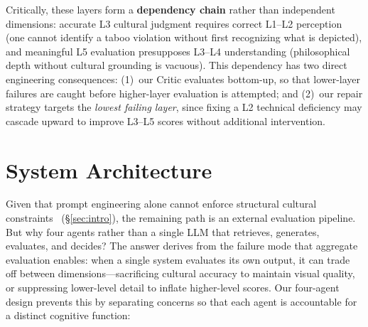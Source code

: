 \documentclass[sigconf, screen, review, anonymous]{acmart}
\newcommand{\Lx}[1]{L#1}
\begin{document}
\noindent
Critically, these layers form a \textbf{dependency chain} rather than independent dimensions: accurate \Lx{3} cultural judgment requires correct \Lx{1}--\Lx{2} perception (one cannot identify a taboo violation without first recognizing what is depicted), and meaningful \Lx{5} evaluation presupposes \Lx{3}--\Lx{4} understanding (philosophical depth without cultural grounding is vacuous).
This dependency has two direct engineering consequences: (1)~our Critic evaluates bottom-up, so that lower-layer failures are caught before higher-layer evaluation is attempted; and (2)~our repair strategy targets the \emph{lowest failing layer}, since fixing a \Lx{2} technical deficiency may cascade upward to improve \Lx{3}--\Lx{5} scores without additional intervention.

\section{System Architecture}
\label{sec:system}

Given that prompt engineering alone cannot enforce structural cultural constraints~\cite{jeong2025culturetrip, ventura2025cultural, shi2025culture} (\S\ref{sec:intro}), the remaining path is an external evaluation pipeline.
But why four agents rather than a single LLM that retrieves, generates, evaluates, and decides?
The answer derives from the failure mode that aggregate evaluation enables: when a single system evaluates its own output, it can trade off between dimensions---sacrificing cultural accuracy to maintain visual quality, or suppressing lower-level detail to inflate higher-level scores.
Our four-agent design prevents this by separating concerns so that each agent is accountable for a distinct cognitive function:
\end{document}
